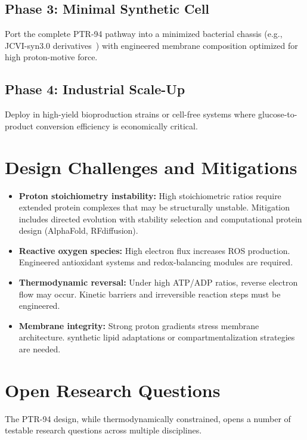 \documentclass[12pt]{article}
\begin{document}
\subsection{Phase 3: Minimal Synthetic Cell}

Port the complete PTR-94 pathway into a minimized bacterial chassis (e.g., JCVI-syn3.0 derivatives~\cite{hutchinson2016design}) with engineered membrane composition optimized for high proton-motive force.

\subsection{Phase 4: Industrial Scale-Up}

Deploy in high-yield bioproduction strains or cell-free systems where glucose-to-product conversion efficiency is economically critical.

\section{Design Challenges and Mitigations}

\begin{itemize}
    \item \textbf{Proton stoichiometry instability:} High stoichiometric ratios require extended protein complexes that may be structurally unstable. Mitigation includes directed evolution with stability selection and computational protein design (AlphaFold, RFdiffusion).
    \item \textbf{Reactive oxygen species:} High electron flux increases ROS production. Engineered antioxidant systems and redox-balancing modules are required.
    \item \textbf{Thermodynamic reversal:} Under high ATP/ADP ratios, reverse electron flow may occur. Kinetic barriers and irreversible reaction steps must be engineered.
    \item \textbf{Membrane integrity:} Strong proton gradients stress membrane architecture. synthetic lipid adaptations or compartmentalization strategies are needed.
\end{itemize}

\section{Open Research Questions}

The PTR-94 design, while thermodynamically constrained, opens a number of testable research questions across multiple disciplines.
\end{document}
